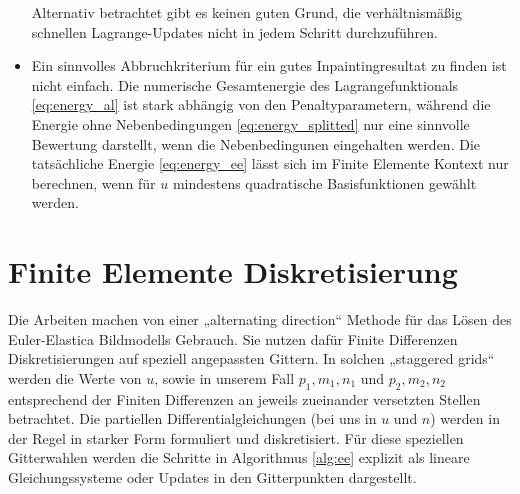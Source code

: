 \documentclass{mythesis}
\begin{document}
\begin{algorithm}
\begin{note}
\begin{itemize}
		Alternativ betrachtet gibt es keinen guten Grund, die verhältnismäßig schnellen Lagrange-Updates nicht in jedem Schritt durchzuführen.
	    \item %
		Ein sinnvolles Abbruchkriterium für ein gutes Inpaintingresultat zu finden ist nicht einfach.
		Die numerische Gesamtenergie des Lagrangefunktionals \eqref{eq:energy_al} ist stark abhängig von den Penaltyparametern, während die Energie ohne Nebenbedingungen \eqref{eq:energy_splitted} nur eine sinnvolle Bewertung darstellt, wenn die Nebenbedingunen eingehalten werden.
		Die tatsächliche Energie \eqref{eq:energy_ee} lässt sich im Finite Elemente Kontext nur berechnen, wenn für $u$ mindestens quadratische Basisfunktionen gewählt werden.

	\end{itemize}
    \end{note}
\end{algorithm}


\section{Finite Elemente Diskretisierung}

Die Arbeiten \cite{tai2011fast,yashtini2015alternating,hahn2011fast,duan2013fast} machen von einer „alternating direction“ Methode für das Lösen des Euler-Elastica Bildmodells Gebrauch.
Sie nutzen dafür Finite Differenzen Diskretisierungen auf speziell angepassten Gittern.
In solchen „staggered grids“ \cite{tai2011fast} werden die Werte von $u$, sowie in unserem Fall $p_1, m_1, n_1$ und $p_2, m_2, n_2$ entsprechend der Finiten Differenzen an jeweils zueinander versetzten Stellen betrachtet.
Die partiellen Differentialgleichungen (bei uns in $u$ und $n$) werden in der Regel in starker Form formuliert und diskretisiert.
Für diese speziellen Gitterwahlen werden die Schritte in Algorithmus \ref{alg:ee} explizit als lineare Gleichungssysteme oder Updates in den Gitterpunkten dargestellt.
\end{document}
